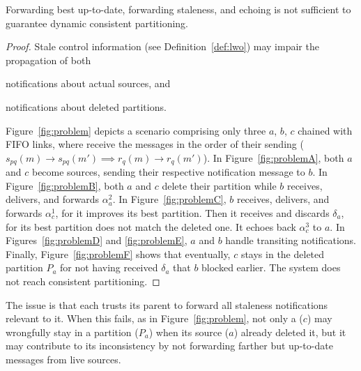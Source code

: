
\begin{lemma} Forwarding best up-to-date,
  forwarding staleness, and echoing is not sufficient to guarantee
  dynamic consistent partitioning.
\end{lemma}

\begin{proof}
Stale control information (see Definition~\ref{def:lwo}) may impair
the propagation of both
\begin{inparaenum}[(i)]
\item notifications about actual sources, and
\item notifications about deleted partitions.
\end{inparaenum}
Figure~\ref{fig:problem} depicts a scenario comprising only three
\processes $a$, $b$, $c$ chained with FIFO links, \ie where \processes
receive the messages in the order of their sending ($s_{pq}(m)
\rightarrow s_{pq}(m') \implies r_q(m) \rightarrow r_q(m')$). In
Figure~\ref{fig:problemA}, both $a$ and $c$ become sources, sending
their respective notification message to $b$. In
Figure~\ref{fig:problemB}, both $a$ and $c$ delete their partition
while $b$ receives, delivers, and forwards $\alpha_a^2$. In
Figure~\ref{fig:problemC}, $b$ receives, delivers, and forwards
$\alpha_c^1$, for it improves its best partition. Then it receives and
discards $\delta_a$, for its best partition does not match the deleted
one. It echoes back $\alpha_c^3$ to $a$. In Figures~\ref{fig:problemD}
and \ref{fig:problemE}, $a$ and $b$ handle transiting
notifications. Finally, Figure~\ref{fig:problemF} shows that
eventually, $c$ stays in the deleted partition $P_a$ for not having
received $\delta_a$ that $b$ blocked earlier. The system does not
reach consistent partitioning. \end{proof}

The issue is that each \process trusts its parent to forward all
staleness notifications relevant to it. When this fails, as in
Figure~\ref{fig:problem}, not only a \process ($c$) may wrongfully
stay in a partition ($P_a$) when its source ($a$) already deleted it,
but it may contribute to its inconsistency by not forwarding farther
but up-to-date messages from live sources.

